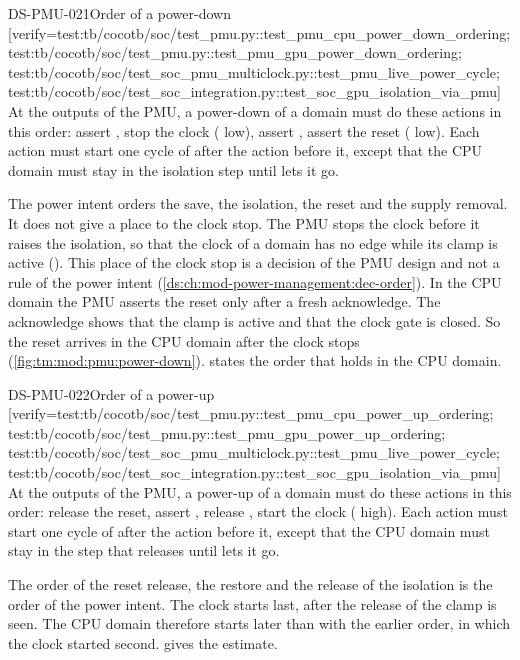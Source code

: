 \begin{requirement}{DS-PMU-021}{Order of a power-down}
[verify={test:tb/cocotb/soc/test_pmu.py::test_pmu_cpu_power_down_ordering; test:tb/cocotb/soc/test_pmu.py::test_pmu_gpu_power_down_ordering; test:tb/cocotb/soc/test_soc_pmu_multiclock.py::test_pmu_live_power_cycle; test:tb/cocotb/soc/test_soc_integration.py::test_soc_gpu_isolation_via_pmu}]
At the outputs of the PMU, a power-down of a domain must do these actions in this order: assert , stop the clock ( low), assert , assert the reset ( low). Each action must start one cycle of  after the action before it, except that the CPU domain must stay in the isolation step until  lets it go.
\end{requirement}
\begin{information}
The power intent orders the save, the isolation, the reset and the supply removal. It does not give a place to the clock stop. The PMU stops the clock before it raises the isolation, so that the clock of a domain has no edge while its clamp is active (). This place of the clock stop is a decision of the PMU design and not a rule of the power intent (\cref{ds:ch:mod-power-management:dec-order}). In the CPU domain the PMU asserts the reset only after a fresh acknowledge. The acknowledge shows that the clamp is active and that the clock gate is closed. So the reset arrives in the CPU domain after the clock stops (\cref{fig:tm:mod:pmu:power-down}).  states the order that holds in the CPU domain.
\end{information}

\begin{requirement}{DS-PMU-022}{Order of a power-up}
[verify={test:tb/cocotb/soc/test_pmu.py::test_pmu_cpu_power_up_ordering; test:tb/cocotb/soc/test_pmu.py::test_pmu_gpu_power_up_ordering; test:tb/cocotb/soc/test_soc_pmu_multiclock.py::test_pmu_live_power_cycle; test:tb/cocotb/soc/test_soc_integration.py::test_soc_gpu_isolation_via_pmu}]
At the outputs of the PMU, a power-up of a domain must do these actions in this order: release the reset, assert , release , start the clock ( high). Each action must start one cycle of  after the action before it, except that the CPU domain must stay in the step that releases  until  lets it go.
\end{requirement}
\begin{information}
The order of the reset release, the restore and the release of the isolation is the order of the power intent. The clock starts last, after the release of the clamp is seen. The CPU domain therefore starts later than with the earlier order, in which the clock started second.  gives the estimate.
\end{information}

